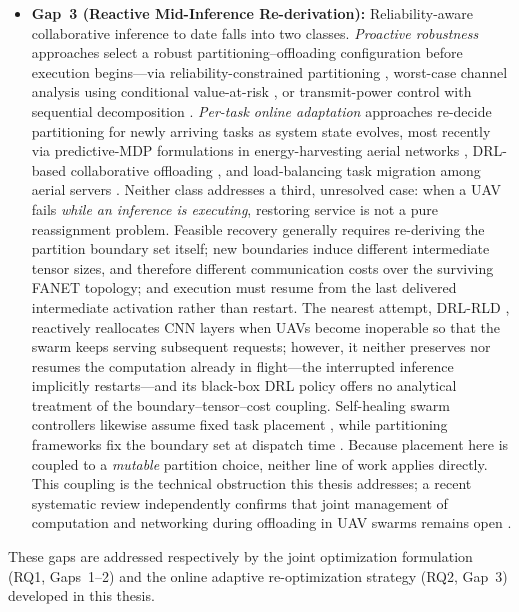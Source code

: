 \begin{itemize}
  \item \textbf{Gap~3 (Reactive Mid-Inference Re-derivation):} Reliability-aware collaborative inference to date falls into two classes. \emph{Proactive robustness} approaches select a robust partitioning--offloading configuration before execution begins---via reliability-constrained partitioning \cite{zhao2022reliable}, worst-case channel analysis using conditional value-at-risk \cite{cdpo2024}, or transmit-power control with sequential decomposition \cite{dhuheir2023llhr}. \emph{Per-task online adaptation} approaches re-decide partitioning for newly arriving tasks as system state evolves, most recently via predictive-MDP formulations in energy-harvesting aerial networks \cite{gao2025pmdp}, DRL-based collaborative offloading \cite{seid2021multiagent}, and load-balancing task migration among aerial servers \cite{meng2026migration}. Neither class addresses a third, unresolved case: when a UAV fails \emph{while an inference is executing}, restoring service is not a pure reassignment problem. Feasible recovery generally requires re-deriving the partition boundary set itself; new boundaries induce different intermediate tensor sizes, and therefore different communication costs over the surviving FANET topology; and execution must resume from the last delivered intermediate activation rather than restart. The nearest attempt, DRL-RLD \cite{kim2024drlrld}, reactively reallocates CNN layers when UAVs become inoperable so that the swarm keeps serving subsequent requests; however, it neither preserves nor resumes the computation already in flight---the interrupted inference implicitly restarts---and its black-box DRL policy offers no analytical treatment of the boundary--tensor--cost coupling. Self-healing swarm controllers likewise assume fixed task placement \cite{pan2025selfhealing}, while partitioning frameworks fix the boundary set at dispatch time \cite{hu2019dads,zhao2025joint,eshratifar2019jointdnn}. Because placement here is coupled to a \emph{mutable} partition choice, neither line of work applies directly. This coupling is the technical obstruction this thesis addresses; a recent systematic review independently confirms that joint management of computation and networking during offloading in UAV swarms remains open \cite{baktayan2024slr}.
\end{itemize}

These gaps are addressed respectively by the joint optimization formulation (RQ1, Gaps~1--2) and the online adaptive re-optimization strategy (RQ2, Gap~3) developed in this thesis.
